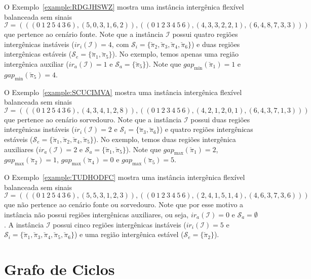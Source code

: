 O Exemplo~\ref{example:RDGJHSWZ} mostra uma instância intergênica flexível balanceada sem sinais $\mathcal{I} = (((0~1~2~5~4~3~6),(5,0,3,1,6,2)),((0~1~2~3~4~5~6),(4,3,3,2,2,1),(6,4,8,7,3,3)))$ que pertence ao cenário fonte. Note que a instância $\mathcal{I}$ possui quatro regiões intergênicas instáveis ($ir_i(\mathcal{I}) = 4$, com $\mathcal{S}_{i}=\{\breve\pi_2,\breve\pi_3,\breve\pi_4,\breve\pi_6\}$) e duas regiões intergênicas estáveis ($\mathcal{S}_{e}=\{\breve\pi_1,\breve\pi_5\}$). No exemplo, temos apenas uma região intergênica auxiliar ($ir_a(\mathcal{I}) = 1$ e $\mathcal{S}_{a}=\{\breve\pi_5\}$). Note que $gap_{\min}(\breve\pi_1) = 1$ e $gap_{\min}(\breve\pi_5) = 4$.

\pagebreak



O Exemplo~\ref{example:SCUCIMVA} mostra uma instância intergênica flexível balanceada sem sinais $\mathcal{I} = (((0~1~2~5~4~3~6),(4,3,4,1,2,8)),((0~1~2~3~4~5~6),(4,2,1,2,0,1),(6,4,3,7,1,3)))$ que pertence ao cenário sorvedouro. Note que a instância $\mathcal{I}$ possui duas regiões intergênicas instáveis ($ir_i(\mathcal{I}) = 2$ e $\mathcal{S}_{i}=\{\breve\pi_3,\breve\pi_6\}$) e quatro regiões intergênicas estáveis ($\mathcal{S}_{e}=\{\breve\pi_1,\breve\pi_2,\breve\pi_4,\breve\pi_5\}$). No exemplo, temos duas regiões intergênica auxiliares ($ir_a(\mathcal{I}) = 2$ e $\mathcal{S}_{a}=\{\breve\pi_1,\breve\pi_5\}$). Note que $gap_{\max}(\breve\pi_1) = 2$, $gap_{\max}(\breve\pi_2) = 1$, $gap_{\max}(\breve\pi_4) = 0$ e $gap_{\max}(\breve\pi_5) = 5$.



O Exemplo~\ref{example:TUDHODFC} mostra uma instância intergênica flexível balanceada sem sinais $\mathcal{I} = (((0~1~2~5~4~3~6),(5,5,3,1,2,3)),((0~1~2~3~4~5~6),(2,4,1,5,1,4),(4,6,3,7,3,6)))$ que não pertence ao cenário fonte ou sorvedouro. Note que por esse motivo a instância não possui regiões intergênicas auxiliares, ou seja, $ir_a(\mathcal{I}) = 0$ e $\mathcal{S}_{a}=\emptyset$. A instância $\mathcal{I}$ possui cinco regiões intergênicas instáveis ($ir_i(\mathcal{I}) = 5$ e $\mathcal{S}_{i}=\{\breve\pi_1,\breve\pi_3,\breve\pi_4,\breve\pi_5,\breve\pi_6\}$) e uma região intergênica estável ($\mathcal{S}_{e}=\{\breve\pi_2\}$).



\section{Grafo de Ciclos}

